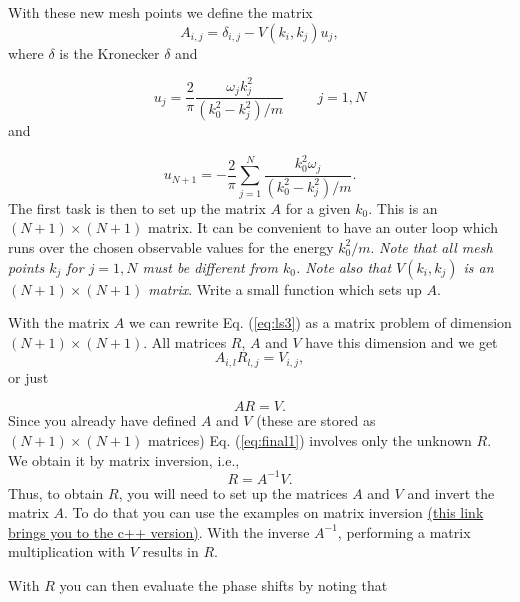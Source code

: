 \documentclass[%
oneside,                 %
final,                   %
10pt]{article}
\begin{document}
With these new mesh points we define the matrix
\begin{equation}        \label{eq:aeq}
A_{i,j}=\delta_{i,j}-V(k_i,k_j)u_j,
\end{equation}
where $\delta$ is the Kronecker $\delta$
and

\begin{equation}
     u_j=\frac{2}{\pi}
         \frac{\omega_jk_j^2}{(k_0^2-k_j^2)/m}\hspace{1cm}
         j=1,N
\end{equation}
and

\begin{equation}
     u_{N+1}=-\frac{2}{\pi}
          \sum_{j=1}^N\frac{k_0^2\omega_j}{(k_0^2-k_j^2)/m}.
\end{equation}
The first task is then to 
set up the matrix $A$ for a given $k_0$. This is an
$(N+1)\times (N+1)$ matrix. It can be convenient
to have an outer loop which runs over the chosen
observable values for the energy $k_0^2/m$.
{\em Note that all mesh points $k_j$ for $j=1,N$ must be
different from $k_0$. Note also that
$V(k_i,k_j)$ is an
$(N+1)\times (N+1)$ matrix}. Write a small function
which sets up $A$.

With the matrix $A$ we can rewrite Eq. (\ref{eq:ls3})    as a matrix problem of dimension $(N+1)\times (N+1)$.   All matrices $R$, $A$ and $V$ have this dimension   and we get
\begin{equation}
A_{i,l}R_{l,j}=V_{i,j},
\end{equation}
or just

\begin{equation}
    AR=V.
    \label{eq:final1}
\end{equation}
Since you already have defined $A$ and $V$ (these are stored as $(N+1)\times (N+1)$ matrices)  Eq. (\ref{eq:final1}) involves only the unknown $R$. We obtain it by matrix inversion, i.e.,
\begin{equation} \label{eq:final2}
R=A^{-1}V.     
\end{equation}
Thus, to obtain $R$, you will need to set up the matrices
$A$ and $V$ and invert the matrix $A$. To do that
you can use the examples on matrix inversion \href{{https://github.com/ManyBodyPhysics/NuclearForces/tree/master/doc/Programs/ScatteringTheory/Cpp/MatrixInverse}}{(this link brings you to the c++ version)}.
With the inverse $A^{-1}$, performing
a matrix multiplication with $V$ results in $R$.


With $R$ you can then evaluate the phase shifts
by noting that
\end{document}
